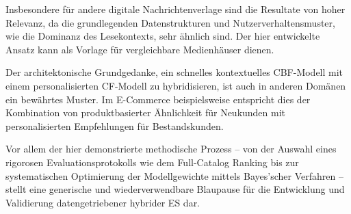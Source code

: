 Insbesondere für andere digitale Nachrichtenverlage sind die Resultate von hoher Relevanz, da die grundlegenden 
Datenstrukturen und Nutzerverhaltensmuster, wie die Dominanz des Lesekontexts, sehr ähnlich sind. 
Der hier entwickelte Ansatz kann als Vorlage für vergleichbare Medienhäuser dienen.

Der architektonische Grundgedanke, ein schnelles kontextuelles \ac{CBF}-Modell mit einem personalisierten 
\ac{CF}-Modell zu hybridisieren, ist auch in anderen Domänen ein bewährtes Muster. Im E-Commerce beispielsweise 
entspricht dies der Kombination von produktbasierter Ähnlichkeit für Neukunden mit personalisierten Empfehlungen 
für Bestandskunden.

Vor allem der hier demonstrierte methodische Prozess – von der Auswahl eines rigorosen Evaluationsprotokolls 
wie dem Full-Catalog Ranking bis zur systematischen Optimierung der Modellgewichte mittels Bayes'scher 
Verfahren – stellt eine generische und wiederverwendbare Blaupause für die Entwicklung und Validierung 
datengetriebener hybrider \ac{ES} dar.